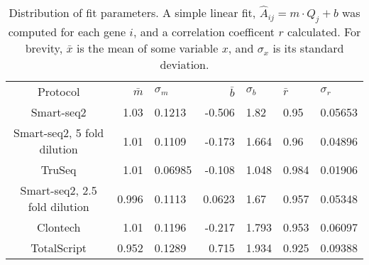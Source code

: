 
\begin{table}[htdp]

\caption{Distribution of fit parameters. A simple linear fit,
             $\hat{A}_{ij} = m \cdot Q_{j} + b$
             was computed for each gene $i$, and a correlation coefficent $r$
             calculated.  For brevity,
             $\bar{x}$ is the mean of some variable $x$, and $\sigma_x$ is its
             standard deviation.  }
\begin{center}
\begin{tabular}{|c|r@{$\pm$}l|r@{$\pm$}l|}
Protocol & $\bar{m}$ & $\sigma_m$ & $\bar{b}$ & $\sigma_b$ & $\bar{r}$ & $\sigma_r$ \\
Smart-seq2 & 1.03 & 0.1213 & -0.506 & 1.82 & 0.95 & 0.05653 \\
Smart-seq2, 5 fold dilution & 1.01 & 0.1109 & -0.173 & 1.664 & 0.96 & 0.04896 \\
TruSeq & 1.01 & 0.06985 & -0.108 & 1.048 & 0.984 & 0.01906 \\
Smart-seq2, 2.5 fold dilution & 0.996 & 0.1113 & 0.0623 & 1.67 & 0.957 & 0.05348 \\
Clontech & 1.01 & 0.1196 & -0.217 & 1.793 & 0.953 & 0.06097 \\
TotalScript & 0.952 & 0.1289 & 0.715 & 1.934 & 0.925 & 0.09388 \\
\end{tabular}
\label{tab:fits}
\end{center}
\end{table}



              